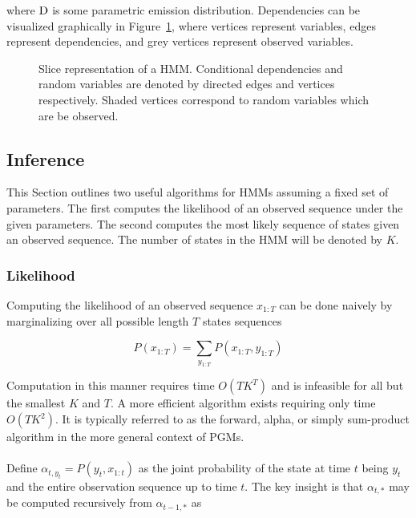 \documentclass[12pt]{report}
\newcommand{\1}[0]{\mathbbm{1}}
\newcommand{\SomeDist}[0]{\textnormal{D}}
\newcommand{\seq}[3]{\ensuremath{#1_{{#2}:{#3}}}}
\begin{document}
where $\SomeDist$ is some parametric emission distribution.
Dependencies can be visualized graphically in Figure~\ref{fig:hmm},
where vertices represent variables, edges represent dependencies,
and grey vertices represent observed variables.

\begin{figure}[ht!]
    \centering
    \caption[Slice representation of a HMM]{
        Slice representation of a HMM.
        Conditional dependencies and random variables are denoted by
        directed edges and vertices respectively. Shaded vertices correspond
        to random variables which are be observed.
    }
    \label{fig:hmm}
\end{figure}

\subsection{Inference}
This Section outlines two useful algorithms for \acp{HMM}
assuming a fixed set of parameters. The first computes the
likelihood of an observed sequence under the given parameters.
The second computes the most likely sequence of states given
an observed sequence. The number of states in the \ac{HMM} will
be denoted by $K$.

\subsubsection{Likelihood}
Computing the likelihood of an observed sequence $\seq{x}{1}{T}$ can be done naively
by marginalizing over all possible length $T$ states sequences

\[
    P(\seq{x}{1}{T}) = \sum_{\seq{y}{1}{T}} P(\seq{x}{1}{T}, \seq{y}{1}{T})
\]

Computation in this manner requires time $O(TK^T)$ and is infeasible for all
but the smallest $K$ and $T$. A more efficient algorithm exists requiring only time
$O(TK^2)$. It is typically referred to as the forward, alpha, or
simply sum-product algorithm in the more general context of \acp{PGM}.
\\\\
Define $\alpha_{t,y_t} = P(y_t, \seq{x}{1}{t})$ as the joint probability
of the state at time $t$ being $y_t$ and the entire observation sequence up to
time $t$. The key insight is that $\alpha_{t,*}$ may be computed recursively
from $\alpha_{t-1,*}$ as
\end{document}
